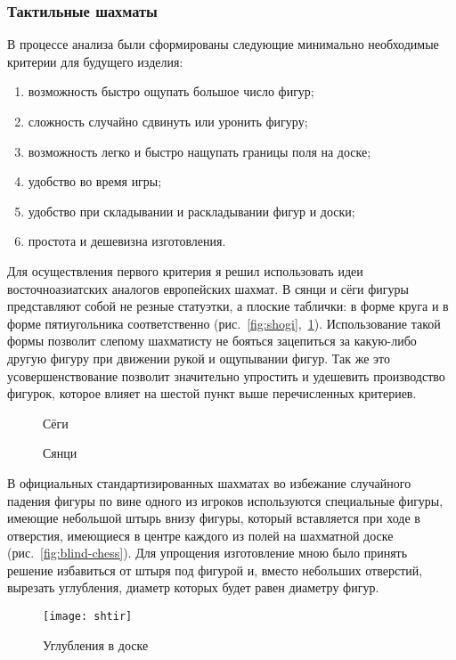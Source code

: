 \subsubsection{Тактильные шахматы}
В процессе анализа были сформированы следующие минимально необходимые критерии
для будущего изделия:
\begin{enumerate}
    \item возможность быстро ощупать большое число фигур;
    \item сложность случайно сдвинуть или уронить фигуру;
    \item возможность легко и быстро нащупать границы поля на доске;
    \item удобство во время игры;
    \item удобство при складывании и раскладывании фигур и доски;
    \item простота и дешевизна изготовления.
\end{enumerate}
Для осуществления первого критерия я решил использовать идеи восточноазиатских
аналогов европейских шахмат. В сянци и сёги фигуры представляют собой не резные
статуэтки, а плоские таблички: в форме круга и в форме пятиугольника
соответственно (рис.~\ref{fig:shogi},~\ref{fig:syanci}). Использование такой формы
позволит слепому шахматисту не бояться зацепиться за какую-либо другую фигуру
при движении рукой и ощупывании фигур. Так же это усовершенствование позволит
значительно упростить и удешевить производство фигурок, которое влияет на
шестой пункт выше перечисленных критериев.
\begin{figure}[h]
    \begin{minipage}[h]{0.5\linewidth}
        \caption{Сёги}\label{fig:shogi}
    \end{minipage}
    \begin{minipage}[h]{0.5\linewidth}
        \caption{Сянци}\label{fig:syanci}
    \end{minipage}
\end{figure}

В официальных стандартизированных шахматах во избежание случайного падения
фигуры по вине одного из игроков используются специальные фигуры, имеющие
небольшой штырь внизу фигуры, который вставляется при ходе в отверстия,
имеющиеся в центре каждого из полей на шахматной доске
(рис.~\ref{fig:blind-chess}). Для упрощения изготовление мною было принять
решение избавиться от штыря под фигурой и, вместо небольших отверстий, вырезать
углубления, диаметр которых будет равен диаметру фигур.
\begin{figure}[h]
    \centering
    \texttt{[image: shtir]}
    \caption{Углубления в доске}\label{fig:shtir}
\end{figure}

